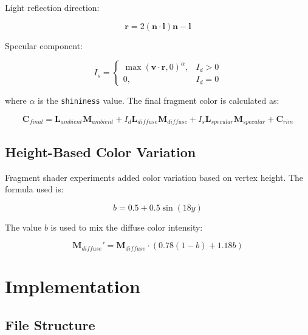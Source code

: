 \documentclass[12pt,a4paper]{article}
\begin{document}
Light reflection direction:

\begin{equation}
    \mathbf{r} =
    2(\mathbf{n}\cdot\mathbf{l})\mathbf{n} - \mathbf{l}
\end{equation}

Specular component:

\begin{equation}
    I_s =
    \begin{cases}
        \max(\mathbf{v}\cdot\mathbf{r}, 0)^\alpha, & I_d > 0 \\
        0, & I_d = 0
    \end{cases}
\end{equation}

where $\alpha$ is the \texttt{shininess} value. The final fragment color is calculated as:

\begin{equation}
    \mathbf{C}_{final}
    =
    \mathbf{L}_{ambient}\mathbf{M}_{ambient}
    +
    I_d\mathbf{L}_{diffuse}\mathbf{M}_{diffuse}
    +
    I_s\mathbf{L}_{specular}\mathbf{M}_{specular}
    +
    \mathbf{C}_{rim}
\end{equation}

\subsection{Height-Based Color Variation}

Fragment shader experiments added color variation based on vertex height.
The formula used is:

\begin{equation}
    b = 0.5 + 0.5\sin(18y)
\end{equation}

The value $b$ is used to mix the diffuse color intensity:

\begin{equation}
    \mathbf{M}_{diffuse}' =
    \mathbf{M}_{diffuse} \cdot
    \left(0.78(1-b) + 1.18b\right)
\end{equation}


\section{Implementation}

\subsection{File Structure}
\end{document}
